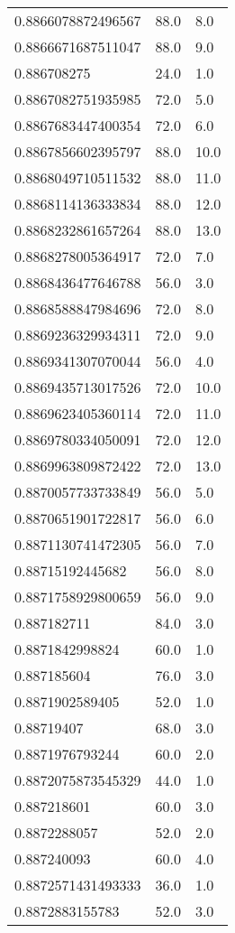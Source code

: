 \begin{center}
\begin{supertabular}[H]{p{0.30\textwidth}p{0.05\textwidth}p{0.05\textwidth}}
0.8866078872496567 & 88.0 & 8.0 \\ 
0.8866671687511047 & 88.0 & 9.0 \\ 
0.886708275 & 24.0 & 1.0 \\ 
0.8867082751935985 & 72.0 & 5.0 \\ 
0.8867683447400354 & 72.0 & 6.0 \\ 
0.8867856602395797 & 88.0 & 10.0 \\ 
0.8868049710511532 & 88.0 & 11.0 \\ 
0.8868114136333834 & 88.0 & 12.0 \\ 
0.8868232861657264 & 88.0 & 13.0 \\ 
0.8868278005364917 & 72.0 & 7.0 \\ 
0.8868436477646788 & 56.0 & 3.0 \\ 
0.8868588847984696 & 72.0 & 8.0 \\ 
0.8869236329934311 & 72.0 & 9.0 \\ 
0.8869341307070044 & 56.0 & 4.0 \\ 
0.8869435713017526 & 72.0 & 10.0 \\ 
0.8869623405360114 & 72.0 & 11.0 \\ 
0.8869780334050091 & 72.0 & 12.0 \\ 
0.8869963809872422 & 72.0 & 13.0 \\ 
0.8870057733733849 & 56.0 & 5.0 \\ 
0.8870651901722817 & 56.0 & 6.0 \\ 
0.8871130741472305 & 56.0 & 7.0 \\ 
0.88715192445682 & 56.0 & 8.0 \\ 
0.8871758929800659 & 56.0 & 9.0 \\ 
0.887182711 & 84.0 & 3.0 \\ 
0.8871842998824 & 60.0 & 1.0 \\ 
0.887185604 & 76.0 & 3.0 \\ 
0.8871902589405 & 52.0 & 1.0 \\ 
0.88719407 & 68.0 & 3.0 \\ 
0.8871976793244 & 60.0 & 2.0 \\ 
0.8872075873545329 & 44.0 & 1.0 \\ 
0.887218601 & 60.0 & 3.0 \\ 
0.8872288057 & 52.0 & 2.0 \\ 
0.887240093 & 60.0 & 4.0 \\ 
0.8872571431493333 & 36.0 & 1.0 \\ 
0.8872883155783 & 52.0 & 3.0 \\ 

\end{supertabular}
\end{center}
